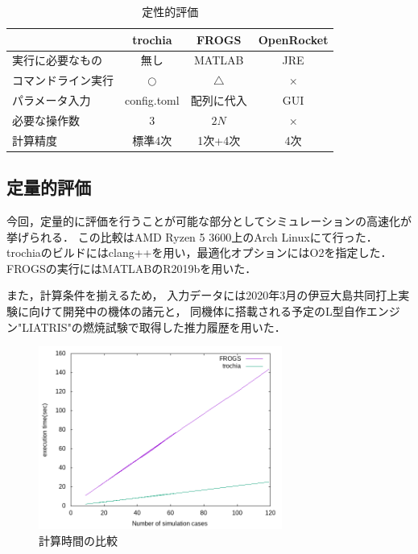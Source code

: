 \documentclass[a4j,10pt]{jsarticle}
\begin{document}
\begin{table}[htbp]
  \hspace*{0cm}
  \begin{tabular}{|l|c|c|c|} \hline
         & trochia & FROGS & OpenRocket \\ \hline
	実行に必要なもの & 無し & MATLAB & JRE \\
    コマンドライン実行 & $\bigcirc$ & $\bigtriangleup$ & $\times$ \\
    パラメータ入力 & config.toml & 配列に代入 & GUI \\
	必要な操作数 & $3$ & $2N$ & $\times$ \\
	計算精度 & 標準4次 & 1次+4次 & 4次 \\ \hline
  \end{tabular}
  \caption{定性的評価}
\end{table}

\subsection{定量的評価}

今回，定量的に評価を行うことが可能な部分としてシミュレーションの高速化が挙げられる．
この比較はAMD Ryzen 5 3600上のArch Linuxにて行った．
trochiaのビルドにはclang++を用い，最適化オプションにはO2を指定した．
FROGSの実行にはMATLABのR2019bを用いた．

また，計算条件を揃えるため，
入力データには2020年3月の伊豆大島共同打上実験に向けて開発中の機体の諸元と，
同機体に搭載される予定のL型自作エンジン"LIATRIS"の燃焼試験で取得した推力履歴を用いた．

\begin{figure}[htbp]
	\begin{center}
		\includegraphics[width=8cm]{./sim-time.png}
		\caption{計算時間の比較}
		\label{sim-time}
	\end{center}
\end{figure}
\end{document}
